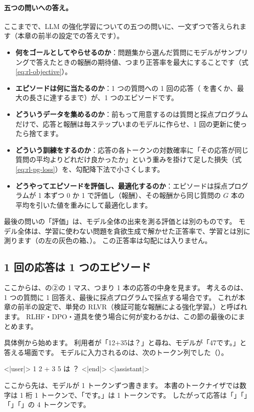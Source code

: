 \paragraph{五つの問いへの答え。}
ここまでで、LLM の強化学習についての五つの問いに、一文ずつで答えられます（本章の前半の設定での答えです）。
\begin{itemize}
\item \textbf{何をゴールとしてやらせるのか}：問題集から選んだ質問にモデルがサンプリングで答えたときの報酬の期待値、つまり正答率を最大にすることです（式\eqref{eq:rl-objective}）。
\item \textbf{エピソードは何に当たるのか}：1 つの質問への 1 回の応答（ を書くか、最大の長さに達するまで）が、1 つのエピソードです。
\item \textbf{どういうデータを集めるのか}：前もって用意するのは質問と採点プログラムだけで、応答と報酬は毎ステップいまのモデルに作らせ、1 回の更新に使ったら捨てます。
\item \textbf{どういう訓練をするのか}：応答の各トークンの対数確率に「その応答が同じ質問の平均よりどれだけ良かったか」という重みを掛けて足した損失（式\eqref{eq:rl-pg-loss}）を、勾配降下法で小さくします。
\item \textbf{どうやってエピソードを評価し、最適化するのか}：エピソードは採点プログラムが 1 本ずつ 0 か 1 で評価し（報酬）、その報酬から同じ質問の $G$ 本の平均を引いた値を重みにして最適化します。
\end{itemize}
最後の問いの「評価」は、モデル全体の出来を測る評価とは別のものです。
モデル全体は、学習に使わない問題を貪欲生成で解かせた正答率で、学習とは別に測ります（の左の灰色の箱、）。
この正答率は勾配には入りません。

\subsection{1 回の応答は 1 つのエピソード}

ここからは、の②の 1 マス、つまり 1 本の応答の中身を見ます。
考えるのは、1 つの質問に 1 回答え、最後に採点プログラムで採点する場合です。
これが本章の前半の設定で、単発の RLVR（検証可能な報酬による強化学習。）と呼ばれます。
RLHF・DPO・道具を使う場合に何が変わるかは、この節の最後のにまとめます。

具体例から始めます。
利用者が「12+35は？」と尋ね、モデルが「47です。」と答える場面です。
モデルに入力されるのは、次のトークン列でした（）。
\begin{textcode}
<|user|> 1 2 + 3 5 は ？ <|end|> <|assistant|>
\end{textcode}
ここから先は、モデルが 1 トークンずつ書きます。
本書のトークナイザでは数字は 1 桁 1 トークンで、「です。」は 1 トークンです。
したがって応答は「」「」「」「」の 4 トークンです。

